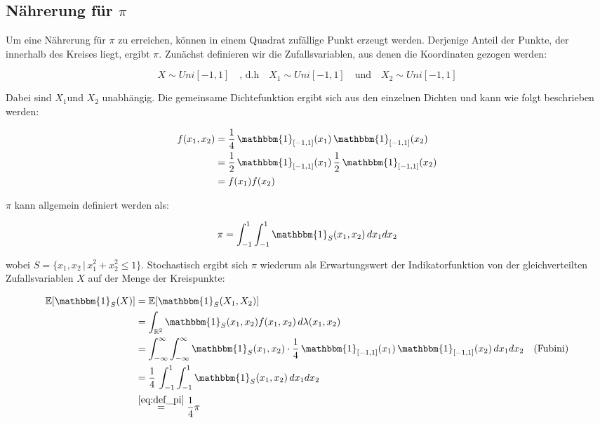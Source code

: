 \documentclass[10pt,]{article}
\begin{document}
\subsection{Nährerung für \(\pi\)}\label{nahrerung-fur-pi}

Um eine Nährerung für \(\pi\) zu erreichen, können in einem Quadrat
zufällige Punkt erzeugt werden. Derjenige Anteil der Punkte, der
innerhalb des Kreises liegt, ergibt \(\pi\). Zunächst definieren wir die
Zufallsvariablen, aus denen die Koordinaten gezogen werden:

\begin{equation*}
X \sim Uni[-1,1]\quad\text{, d.h}\quad X_1 \sim Uni[-1,1] \quad \text{und} \quad X_2 \sim Uni[-1,1]
\end{equation*}

Dabei sind \(X_{1}\)und \(X_{2}\) unabhängig. Die gemeinsame
Dichtefunktion ergibt sich aus den einzelnen Dichten und kann wie folgt
beschrieben werden:

\begin{align*}
f(x_1, x_2) &= \frac{1}{4}\,\mathbbm{1}_{[-1,1]}(x_1)\,\mathbbm{1}_{[-1,1]}(x_2)\\
&= \frac{1}{2}\,\mathbbm{1}_{[-1,1]}(x_1)\,\frac{1}{2}\,\mathbbm{1}_{[-1,1]}(x_2)\\
&= f(x_1)f(x_2)
\end{align*}

\(\pi\) kann allgemein definiert werden als:

\begin{equation}
\label{eq:def_pi}
\pi = \int_{-1}^{1} \int_{-1}^{1} \mathbbm{1}_S(x_1,x_2)\,dx_1 dx_2
\end{equation}

wobei \(S = \{x_1,x_2\,|\,x_1^2+x_2^2 \le 1\}\). Stochastisch ergibt
sich \(\pi\) wiederum als Erwartungswert der Indikatorfunktion von der
gleichverteilten Zufallsvariablen \(X\) auf der Menge der Kreispunkte:

\begin{align*}
\mathbb{E}[\mathbbm{1}_S(X)] &= \mathbb{E}[\mathbbm{1}_S(X_1,X_2)]\\
&= \int_{\mathbb{R}^2} \mathbbm{1}_S(x_1,x_2) f(x_1,x_2)\,d\lambda(x_1,x_2)\\
&= \int_{-\infty}^{\infty} \int_{-\infty}^{\infty} \mathbbm{1}_S(x_1,x_2) \cdot \frac{1}{4} \,\mathbbm{1}_{[-1,1]}(x_1)\,\mathbbm{1}_{[-1,1]}(x_2) \,dx_1 dx_2 \quad \text{(Fubini)}\\
&= \frac{1}{4}\, \int_{-1}^1 \int_{-1}^1 \mathbbm{1}_S(x_1,x_2) \,dx_1 dx_2\\
&\overset{\eqref{eq:def_pi}}{=} \frac{1}{4}\pi
\end{align*}
\end{document}
